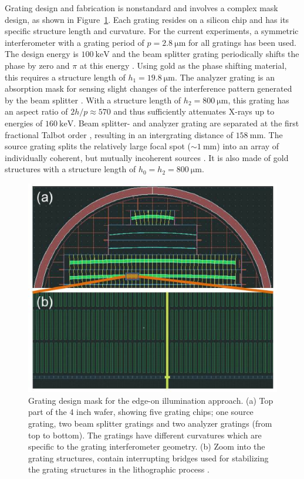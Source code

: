 \documentclass[aps,prl,preprint]{revtex4-1}
\begin{document}
Grating design and fabrication is nonstandard and involves a complex mask
design, as shown in Figure~\ref{Fig:grating_mask}. Each grating resides on a
silicon chip and has its specific structure length and curvature. For the
current experiments, a symmetric interferometer with a grating period of $p
= \SI{2.8}{\micro\metre}$ for all gratings has been used. The design energy
is $\SI{100}{\kilo\electronvolt}$ and the beam splitter grating periodically
shifts the phase by zero and $\pi$ at this energy \cite{David2002}. Using
gold as the phase shifting material, this requires a structure length of
$h_1 = \SI{19.8}{\micro \metre}$. The analyzer grating is an absorption mask
for sensing slight changes of the interference pattern generated by the beam
splitter \cite{Momose2003a}. With a structure length of $h_2 =
\SI{800}{\micro \metre}$, this grating has an aspect ratio of $2h/p \approx
570$ and thus sufficiently attenuates X-rays up to energies of 
$\SI{160}{\kilo\electronvolt}$. Beam splitter- and analyzer grating are
separated at the first fractional Talbot order \cite{Weitkamp2005},
resulting in an intergrating distance of $\SI{158}{\milli\metre}$. The
source grating splits the relatively large focal spot ($\sim
\SI{1}{\milli\metre}$) into an array of individually coherent, but mutually
incoherent sources \cite{Pfeiffer2006}. It is also made of gold structures
with a structure length of $h_0 = h_2 = \SI{800}{\micro \metre}$.
\begin{figure} [ht]
    \includegraphics[width=.5\textwidth]{figures/grating_mask.eps}
    \caption{Grating design mask for
        the edge-on illumination approach. (a) Top part of the 4 inch wafer,
        showing five grating chips; one source grating, two beam splitter
        gratings and two analyzer gratings (from top to bottom). The
        gratings have different curvatures which are specific to the grating
        interferometer geometry. (b) Zoom into the grating structures,
        contain interrupting bridges used for stabilizing the grating
        structures in the lithographic process \cite{Kenntner2010}.}
        \label{Fig:grating_mask}
\end{figure}
\end{document}

